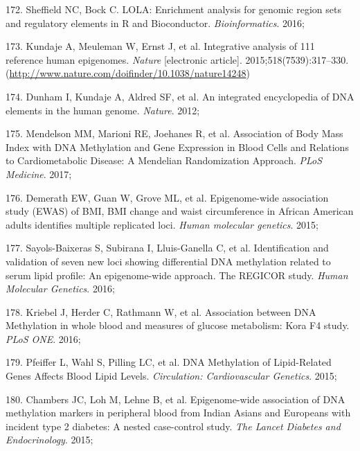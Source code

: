\documentclass[11pt,twoside]{bristolthesis}
\newenvironment{cslreferences}%
  {}%
  {\par}
\begin{document}
\begin{cslreferences}
\leavevmode\hypertarget{ref-Sheffield2016}{}%
172. Sheffield NC, Bock C. LOLA: Enrichment analysis for genomic region sets and regulatory elements in R and Bioconductor. \emph{Bioinformatics}. 2016;

\leavevmode\hypertarget{ref-Kundaje2015}{}%
173. Kundaje A, Meuleman W, Ernst J, et al. Integrative analysis of 111 reference human epigenomes. \emph{Nature} {[}electronic article{]}. 2015;518(7539):317--330. (\url{http://www.nature.com/doifinder/10.1038/nature14248})

\leavevmode\hypertarget{ref-Dunham2012}{}%
174. Dunham I, Kundaje A, Aldred SF, et al. An integrated encyclopedia of DNA elements in the human genome. \emph{Nature}. 2012;

\leavevmode\hypertarget{ref-Mendelson2017}{}%
175. Mendelson MM, Marioni RE, Joehanes R, et al. Association of Body Mass Index with DNA Methylation and Gene Expression in Blood Cells and Relations to Cardiometabolic Disease: A Mendelian Randomization Approach. \emph{PLoS Medicine}. 2017;

\leavevmode\hypertarget{ref-Demerath2015}{}%
176. Demerath EW, Guan W, Grove ML, et al. Epigenome-wide association study (EWAS) of BMI, BMI change and waist circumference in African American adults identifies multiple replicated loci. \emph{Human molecular genetics}. 2015;

\leavevmode\hypertarget{ref-Sayols-Baixeras2016}{}%
177. Sayols-Baixeras S, Subirana I, Lluis-Ganella C, et al. Identification and validation of seven new loci showing differential DNA methylation related to serum lipid profile: An epigenome-wide approach. The REGICOR study. \emph{Human Molecular Genetics}. 2016;

\leavevmode\hypertarget{ref-Kriebel2016}{}%
178. Kriebel J, Herder C, Rathmann W, et al. Association between DNA Methylation in whole blood and measures of glucose metabolism: Kora F4 study. \emph{PLoS ONE}. 2016;

\leavevmode\hypertarget{ref-Pfeiffer2015}{}%
179. Pfeiffer L, Wahl S, Pilling LC, et al. DNA Methylation of Lipid-Related Genes Affects Blood Lipid Levels. \emph{Circulation: Cardiovascular Genetics}. 2015;

\leavevmode\hypertarget{ref-Chambers2015}{}%
180. Chambers JC, Loh M, Lehne B, et al. Epigenome-wide association of DNA methylation markers in peripheral blood from Indian Asians and Europeans with incident type 2 diabetes: A nested case-control study. \emph{The Lancet Diabetes and Endocrinology}. 2015;


\end{cslreferences}
\end{document}
